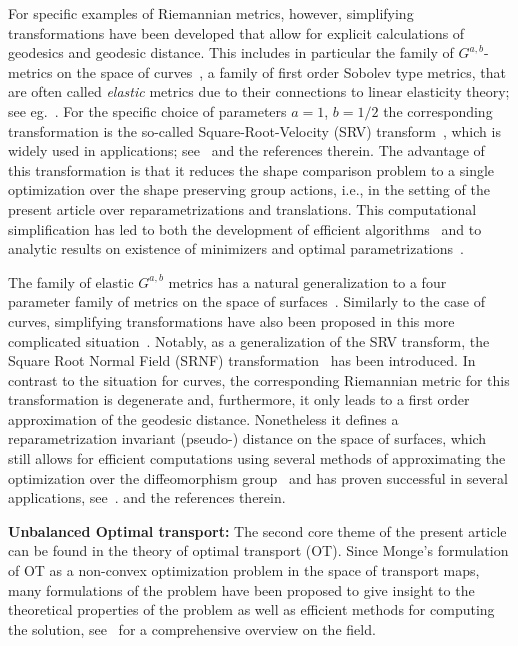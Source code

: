\documentclass[final,hidelinks,onefignum,onetabnum]{siamart220329}
\begin{document}
For specific examples of Riemannian metrics, however, simplifying transformations have been developed that allow for explicit calculations of geodesics and geodesic distance. This includes in particular the family of $G^{a,b}$-metrics on the space of curves~\cite{bauer2022elastic,needham2020simplifying,mio2007shape,younes1998computable},
a family of first order Sobolev type metrics, that are often called \emph{elastic} metrics due to their connections to linear elasticity theory; see eg.~\cite{mio2007shape,charon2022shape,bauer2022elastic}.  For the specific choice of parameters $a=1$, $b=1/2$ the corresponding transformation  is the so-called Square-Root-Velocity (SRV) transform~\cite{srivastava2010shape}, which is widely used in applications; see~\cite{srivastava2016functional} and the references therein. The advantage of this transformation is that it reduces the shape comparison problem to a single optimization over the shape preserving group actions, i.e., in the setting of the present article over reparametrizations and translations. This computational simplification has led to both the development of efficient algorithms~\cite{woien2022pde,dogan2015fast,srivastava2010shape} and to analytic results on existence of minimizers and optimal parametrizations~\cite{bruveris2016optimal,lahiri2015precise,trouve2000class}. 

The family of elastic $G^{a,b}$ metrics has a natural generalization to a four parameter  family of metrics on the space of surfaces~\cite{su2020shape}. Similarly to the case of curves, simplifying transformations have also been proposed in this more complicated situation~\cite{kurtek2010novel,kurtek2011elastic,jermyn2017elastic,su2020simplifying}.  Notably, as a generalization of the SRV transform, the Square Root Normal Field (SRNF) transformation~\cite{jermyn2017elastic} 
has been introduced. In contrast to the situation for curves, the corresponding Riemannian metric for this transformation is degenerate and, furthermore, it only leads to a first order approximation of the geodesic distance. Nonetheless it defines a reparametrization invariant (pseudo-) distance on the space of surfaces,  which still allows for efficient computations using several methods of approximating the optimization over the diffeomorphism group~\cite{laga2017numerical,bauer2020numerical} and has proven successful in several applications, see~\cite{kurtek2014statistical,joshi2016surface,matuk2020biomedical,laga20214d}. 
and the references therein.

{\bf Unbalanced Optimal transport:} 
The second core theme of the present article can be found in the theory of optimal transport (OT). Since Monge's formulation of OT as a non-convex optimization problem in the space of transport maps, many formulations of the problem have been proposed to give insight to the theoretical properties of the problem as well as efficient methods for computing the solution, see~\cite{villani2003topics,villani2008optimal} for a comprehensive overview on the field.   
\end{document}
